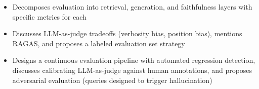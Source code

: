 \begin{interviewq}
\goodgreat
\begin{itemize}
    \item {} Decomposes evaluation into retrieval, generation, and
          faithfulness layers with specific metrics for each
    \item {} Discusses LLM-as-judge tradeoffs (verbosity bias, position
          bias), mentions RAGAS, and proposes a labeled evaluation set strategy
    \item {} Designs a continuous evaluation pipeline with automated
          regression detection, discusses calibrating LLM-as-judge against human
          annotations, and proposes adversarial evaluation (queries designed to
          trigger hallucination)
\end{itemize}

\end{interviewq}

\bigskip

